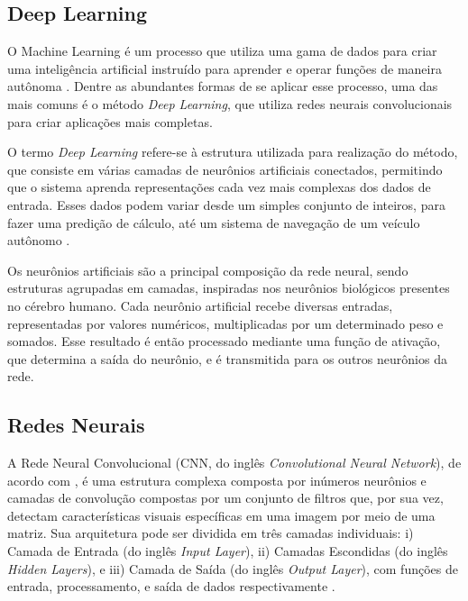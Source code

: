 
\subsection{\esp Deep Learning} \label{deeplearning}

O Machine Learning é um processo que utiliza uma gama de dados para criar uma inteligência artificial instruído para aprender e operar funções de maneira autônoma \cite{machinelearning}. Dentre as abundantes formas de se aplicar esse processo, uma das mais comuns é o método \textit{Deep Learning}, que utiliza redes neurais convolucionais para criar aplicações mais completas. 


O termo \textit{Deep Learning} refere-se à estrutura utilizada para realização do método, que consiste em várias camadas de neurônios artificiais conectados, permitindo que o sistema aprenda representações cada vez mais complexas dos dados de entrada. Esses dados podem variar desde um simples conjunto de inteiros, para fazer uma predição de cálculo, até um sistema de navegação de um veículo autônomo \cite{deeplearning}.

Os neurônios artificiais são a principal composição da rede neural, sendo estruturas agrupadas em camadas, inspiradas nos neurônios biológicos presentes no cérebro humano. Cada neurônio artificial recebe diversas entradas, representadas por valores numéricos, multiplicadas por um determinado peso e somados. Esse resultado é então processado mediante uma função de ativação, que determina a saída do neurônio, e é transmitida para os outros neurônios da rede.




\subsection{\esp Redes Neurais} \label{redesneurais}

A Rede Neural Convolucional  (CNN, do inglês \textit{Convolutional Neural Network}), de acordo com , é uma estrutura complexa composta por inúmeros neurônios e camadas de convolução compostas por um conjunto de filtros que, por sua vez, detectam características visuais específicas em uma imagem por meio de uma matriz. Sua arquitetura pode ser dividida em três camadas individuais: i) Camada de Entrada (do inglês \textit{Input Layer}), ii) Camadas Escondidas (do inglês \textit{Hidden Layers}), e iii) Camada de Saída (do inglês \textit{Output Layer}), com funções de entrada, processamento, e saída de dados respectivamente \cite{medical}.

